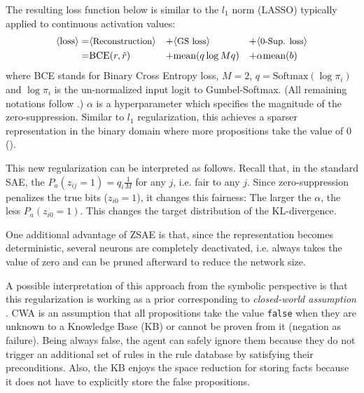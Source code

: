 The resulting loss function below is similar to the $l_1$ norm (LASSO) typically
applied to continuous activation values:
\begin{align*}
 \brackets{\text{loss}} = & \brackets{\text{\small Reconstruction}} &+ & \brackets{\text{\small GS loss}} &+ & \brackets{\text{\small 0-Sup. loss}} \\ 
 =                        & \text{BCE}(r,\tilde{r})     &+ & \text{mean}(q \log Mq)           &+ & \alpha \text{mean}(b)
\end{align*}
where BCE stands for Binary Cross Entropy loss,
$M=2$, $q=\text{Softmax}(\log \pi_i)$ and $\log \pi_i$ is the un-normalized input logit to Gumbel-Softmax.
(All remaining notations follow .)
$\alpha$ is a hyperparameter which specifies the magnitude of the zero-suppression.
Similar to $l_1$ regularization, this achieves a sparser representation in the binary domain where
 more propositions take the value of 0 ().

This new regularization can be interpreted as follows.
Recall that, in the standard SAE, the $P_a(z_{ij}=1)=q_i\frac{1}{M}$ for any $j$, i.e. fair to any $j$.
Since zero-suppression penalizes the true bits ($z_{i0}=1$), it changes this fairness: The larger the $\alpha$,
the less $P_a(z_{i0}=1)$. This changes the target distribution of the KL-divergence.

One additional advantage of ZSAE is that, since the representation becomes deterministic,
several neurons are completely deactivated, i.e. always takes the value of zero
and can be pruned afterward to reduce the network size.

A possible interpretation of this approach from the symbolic perspective is that
this regularization is working as a prior corresponding to \emph{closed-world assumption} \cite[CWA]{reiter1981closed}.
CWA is an assumption that all propositions take the value \texttt{false}
when they are unknown to a Knowledge Base (KB) or cannot be proven from it (negation as failure).
Being always false, the agent can safely ignore them because
they do not trigger an additional set of rules in the rule database by satisfying their preconditions.
Also, the KB enjoys the space reduction for storing facts
because it does not have to explicitly store the false propositions.

